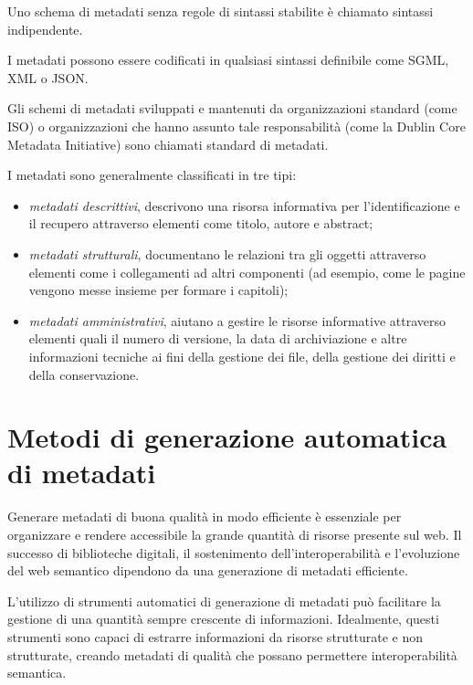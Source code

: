 Uno schema di metadati senza regole di sintassi stabilite è chiamato sintassi indipendente.

I metadati possono essere codificati in qualsiasi sintassi definibile come SGML, XML o JSON.

Gli schemi di metadati sviluppati e mantenuti da organizzazioni standard (come ISO) o organizzazioni che hanno assunto tale responsabilità (come la Dublin Core Metadata Initiative) sono chiamati standard di metadati.

I metadati sono generalmente classificati in tre tipi:
\begin{itemize}
\item \textit{metadati descrittivi}, descrivono una risorsa informativa per l'identificazione e il recupero attraverso elementi come titolo, autore e abstract;
\item \textit{metadati strutturali}, documentano le relazioni tra gli oggetti attraverso elementi come i collegamenti ad altri componenti (ad esempio, come le pagine vengono messe insieme per formare i capitoli);
\item \textit{metadati amministrativi}, aiutano a gestire le risorse informative attraverso elementi quali il numero di versione, la data di archiviazione e altre informazioni tecniche ai fini della gestione dei file, della gestione dei diritti e della conservazione.
\end{itemize}

\section{Metodi di generazione automatica di metadati}
Generare metadati di buona qualità in modo efficiente è essenziale per organizzare e rendere accessibile la grande quantità di risorse presente sul web. Il successo di biblioteche digitali, il sostenimento dell'interoperabilità e l'evoluzione del web semantico dipendono da una generazione di metadati efficiente\cite{metadata}.

\vspace{5mm}

L'utilizzo di strumenti automatici di generazione di metadati può facilitare la gestione di una quantità sempre crescente di informazioni.
Idealmente, questi strumenti sono capaci di estrarre informazioni da risorse strutturate e non strutturate, creando metadati di qualità che possano permettere interoperabilità semantica.

\vspace{5mm}


